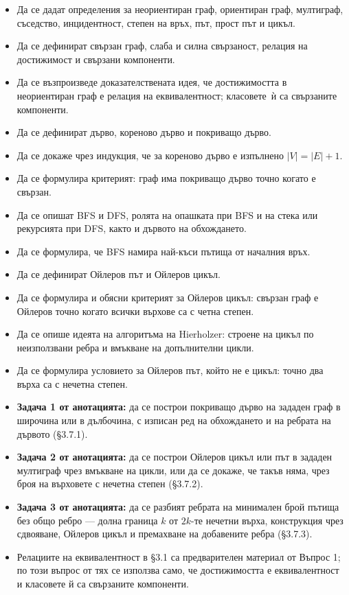 \begin{itemize}
    \item Да се дадат определения за неориентиран граф, ориентиран граф, мултиграф, съседство, инцидентност, степен на връх, път, прост път и цикъл.
    \item Да се дефинират свързан граф, слаба и силна свързаност, релация на достижимост и свързани компоненти.
    \item Да се възпроизведе доказателствената идея, че достижимостта в неориентиран граф е релация на еквивалентност; класовете $\,$ѝ са свързаните компоненти.
    \item Да се дефинират дърво, кореново дърво и покриващо дърво.
    \item Да се докаже чрез индукция, че за кореново дърво е изпълнено $|V|=|E|+1$.
    \item Да се формулира критерият: граф има покриващо дърво точно когато е свързан.
    \item Да се опишат BFS и DFS, ролята на опашката при BFS и на стека или рекурсията при DFS, както и дървото на обхождането.
    \item Да се формулира, че BFS намира най-къси пътища от началния връх.
    \item Да се дефинират Ойлеров път и Ойлеров цикъл.
    \item Да се формулира и обясни критерият за Ойлеров цикъл: свързан граф е Ойлеров точно когато всички върхове са с четна степен.
    \item Да се опише идеята на алгоритъма на Hierholzer: строене на цикъл по неизползвани ребра и вмъкване на допълнителни цикли.
    \item Да се формулира условието за Ойлеров път, който не е цикъл: точно два върха са с нечетна степен.
    \item \textbf{Задача 1 от анотацията:} да се построи покриващо дърво на зададен граф в широчина или в дълбочина, с изписан ред на обхождането и на ребрата на дървото (\S3.7.1).
    \item \textbf{Задача 2 от анотацията:} да се построи Ойлеров цикъл или път в зададен мултиграф чрез вмъкване на цикли, или да се докаже, че такъв няма, чрез броя на върховете с нечетна степен (\S3.7.2).
    \item \textbf{Задача 3 от анотацията:} да се разбият ребрата на минимален брой пътища без общо ребро --- долна граница $k$ от $2k$-те нечетни върха, конструкция чрез сдвояване, Ойлеров цикъл и премахване на добавените ребра (\S3.7.3).
    \item Релациите на еквивалентност в \S3.1 са предварителен материал от Въпрос 1; по този въпрос от тях се използва само, че достижимостта е еквивалентност и класовете й са свързаните компоненти.
\end{itemize}
